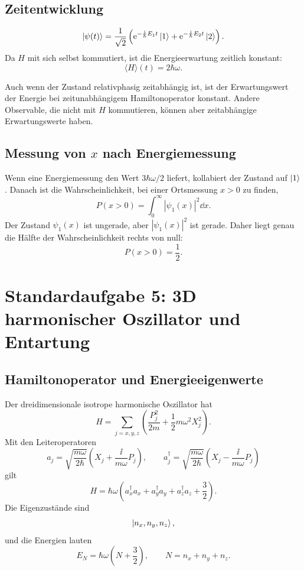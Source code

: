 \subsection{Zeitentwicklung}

\[
    \left|\psi(t)\right\rangle=\frac{1}{\sqrt2}\left(\mathrm{e}^{-\frac{\mathrm{i}}{\hbar}E_1t}\left|1\right\rangle
    +\mathrm{e}^{-\frac{\mathrm{i}}{\hbar}E_2t}\left|2\right\rangle\right).
\]
Da $H$ mit sich selbst kommutiert, ist die Energieerwartung zeitlich konstant:
\[
    \langle H\rangle(t)=2\hbar\omega.
\]

\begin{examtipbox}
Auch wenn der Zustand relativphasig zeitabhängig ist, ist der Erwartungswert der Energie bei zeitunabhängigem Hamiltonoperator konstant. Andere Observable, die nicht mit $H$ kommutieren, können aber zeitabhängige Erwartungswerte haben.
\end{examtipbox}

\subsection{Messung von $x$ nach Energiemessung}

Wenn eine Energiemessung den Wert $3\hbar\omega/2$ liefert, kollabiert der Zustand auf $\left|1\right\rangle$. Danach ist die Wahrscheinlichkeit, bei einer Ortsmessung $x>0$ zu finden,
\[
    P(x>0)=\int_0^\infty |\psi_1(x)|^2\dd x.
\]
Der Zustand $\psi_1(x)$ ist ungerade, aber $|\psi_1(x)|^2$ ist gerade. Daher liegt genau die Hälfte der Wahrscheinlichkeit rechts von null:
\[
    P(x>0)=\frac12.
\]

\section{Standardaufgabe 5: 3D harmonischer Oszillator und Entartung}

\subsection{Hamiltonoperator und Energieeigenwerte}

Der dreidimensionale isotrope harmonische Oszillator hat
\[
    H=\sum_{j=x,y,z}\left(\frac{P_j^2}{2m}+\frac12m\omega^2X_j^2\right).
\]
Mit den Leiteroperatoren
\[
    a_j=\sqrt{\frac{m\omega}{2\hbar}}\left(X_j+\frac{\ii}{m\omega}P_j\right),
    \qquad
    a_j^\dagger=\sqrt{\frac{m\omega}{2\hbar}}\left(X_j-\frac{\ii}{m\omega}P_j\right)
\]
gilt
\[
    H=\hbar\omega\left(a_x^\dagger a_x+a_y^\dagger a_y+a_z^\dagger a_z+\frac32\right).
\]
Die Eigenzustände sind
\[
    \left|n_x,n_y,n_z\right\rangle,
\]
und die Energien lauten
\[
    E_N=\hbar\omega\left(N+\frac32\right),
    \qquad
    N=n_x+n_y+n_z.
\]

